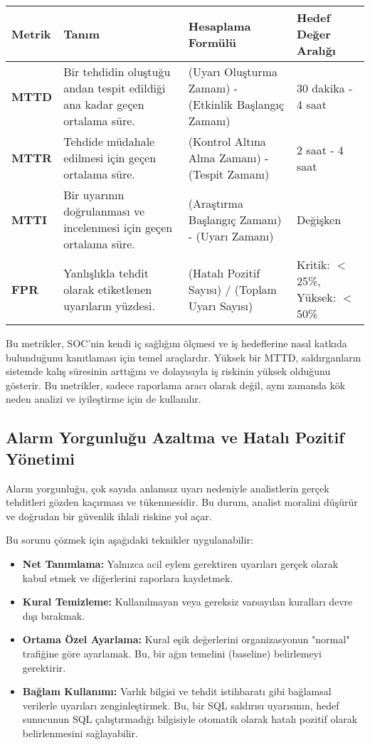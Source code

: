 \begin{longtable}{|p{2.5cm}|p{3cm}|p{3cm}|p{3.5cm}|}
\hline
\textbf{Metrik} & \textbf{Tanım} & \textbf{Hesaplama Formülü} & \textbf{Hedef Değer Aralığı} \\
\hline
\textbf{MTTD} & Bir tehdidin oluştuğu andan tespit edildiği ana kadar geçen ortalama süre. & (Uyarı Oluşturma Zamanı) - (Etkinlik Başlangıç Zamanı) & 30 dakika - 4 saat \\
\hline
\textbf{MTTR} & Tehdide müdahale edilmesi için geçen ortalama süre. & (Kontrol Altına Alma Zamanı) - (Tespit Zamanı) & 2 saat - 4 saat \\
\hline
\textbf{MTTI} & Bir uyarının doğrulanması ve incelenmesi için geçen ortalama süre. & (Araştırma Başlangıç Zamanı) - (Uyarı Zamanı) & Değişken \\
\hline
\textbf{FPR} & Yanlışlıkla tehdit olarak etiketlenen uyarıların yüzdesi. & (Hatalı Pozitif Sayısı) / (Toplam Uyarı Sayısı) & Kritik: $<$25\%, Yüksek: $<$50\% \\
\hline
\end{longtable}

Bu metrikler, SOC'nin kendi iç sağlığını ölçmesi ve iş hedeflerine nasıl katkıda bulunduğunu kanıtlaması için temel araçlardır. Yüksek bir MTTD, saldırganların sistemde kalış süresinin arttığını ve dolayısıyla iş riskinin yüksek olduğunu gösterir. Bu metrikler, sadece raporlama aracı olarak değil, aynı zamanda kök neden analizi ve iyileştirme için de kullanılır.

\subsection{Alarm Yorgunluğu Azaltma ve Hatalı Pozitif Yönetimi}

Alarm yorgunluğu, çok sayıda anlamsız uyarı nedeniyle analistlerin gerçek tehditleri gözden kaçırması ve tükenmesidir. Bu durum, analist moralini düşürür ve doğrudan bir güvenlik ihlali riskine yol açar.

Bu sorunu çözmek için aşağıdaki teknikler uygulanabilir:
\begin{itemize}
    \item \textbf{Net Tanımlama:} Yalnızca acil eylem gerektiren uyarıları gerçek olarak kabul etmek ve diğerlerini raporlara kaydetmek.
    \item \textbf{Kural Temizleme:} Kullanılmayan veya gereksiz varsayılan kuralları devre dışı bırakmak.
    \item \textbf{Ortama Özel Ayarlama:} Kural eşik değerlerini organizasyonun "normal" trafiğine göre ayarlamak. Bu, bir ağın temelini (baseline) belirlemeyi gerektirir.
    \item \textbf{Bağlam Kullanımı:} Varlık bilgisi ve tehdit istihbaratı gibi bağlamsal verilerle uyarıları zenginleştirmek. Bu, bir SQL saldırısı uyarısının, hedef sunucunun SQL çalıştırmadığı bilgisiyle otomatik olarak hatalı pozitif olarak belirlenmesini sağlayabilir.
\end{itemize}

